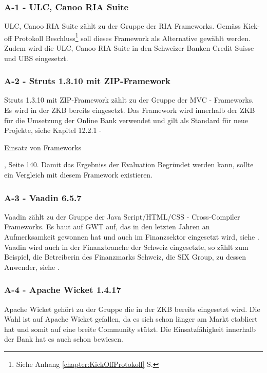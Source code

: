   \subsubsection{A-1 - ULC, Canoo RIA Suite}
  
  ULC, Canoo RIA Suite zählt zu der Gruppe der \ac{RIA} Frameworks. Gemäss
  Kick-off Protokoll Beschluss\footnote{Siehe Anhang
  \ref{chapter:KickOffProtokoll}  S.
  \pageref{chapter:KickOffProtokoll}} soll dieses Framework als Alternative
  gewählt werden. Zudem wird die ULC, Canoo RIA Suite in den Schweizer Banken
  Credit Suisse und UBS eingesetzt.
  
  \subsubsection{A-2 - Struts 1.3.10 mit ZIP-Framework}
  
  Struts 1.3.10 mit ZIP-Framework zählt zu der Gruppe der MVC - Frameworks. Es
  wird in der \ac{ZKB} bereits eingesetzt. Das Framework wird innerhalb der
  \ac{ZKB} für die Umsetzung der Online Bank verwendet und gilt als Standard
  für neue Projekte, siehe \cite{ZkbHandbuchDerItArchitektur} Kapitel 12.2.1 -
  \begin{itshape}Einsatz von Frameworks\end{itshape}, Seite 140. Damit das
  Ergebniss der Evaluation Begründet werden kann, sollte ein Vergleich mit
  diesem Framework existieren.
  
  \subsubsection{A-3 - Vaadin 6.5.7}
  
  Vaadin zählt zu der Gruppe der Java Script/\ac{HTML}/\ac{CSS} -
  Cross-Compiler Frameworks. Es baut auf \ac{GWT} auf, das in den letzten
  Jahren an Aufmerksamkeit gewonnen hat und auch im Finanzsektor eingesetzt
  wird, siehe \cite{GWTImFinanzSektor}. Vaadin wird auch in der Finanzbranche
  der Schweiz eingesetzte, so zählt zum Beispiel, die Betreiberin des
  Finanzmarks Schweiz, die SIX Group, zu dessen Anwender, siehe
  \cite{VaadinInDerSchweiz}.
  
  \subsubsection{A-4 - Apache Wicket 1.4.17}
  
  Apache Wicket gehört zu der Gruppe die in der ZKB bereits eingesetzt wird.
  Die Wahl ist auf Apache Wicket gefallen, da es sich schon länger am Markt
  etabliert hat und somit auf eine breite Community stützt. Die
  Einsatzfähigkeit innerhalb der Bank  hat es auch schon bewiesen.
  
